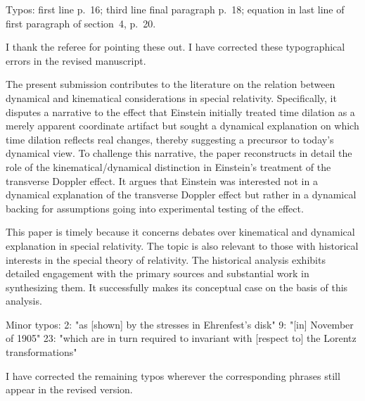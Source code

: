 \documentclass[submitted,11pt]{article}
\begin{document}
\begin{point}
Typos: first line p.~16; third line final paragraph p.~18; equation in last line of first paragraph of section~4, p.~20.
\end{point}

\begin{reply}
I thank the referee for pointing these out. I have corrected these typographical errors in the revised manuscript.
\end{reply}


\reviewersection

\begin{point}
The present submission contributes to the literature on the relation between
dynamical and kinematical considerations in special relativity.  Specifically,
it disputes a narrative to the effect that Einstein initially treated time
dilation as a merely apparent coordinate artifact but sought a dynamical
explanation on which time dilation reflects real changes, thereby suggesting a
precursor to today's dynamical view.  To challenge this narrative, the paper
reconstructs in detail the role of the kinematical/dynamical distinction in
Einstein's treatment of the transverse Doppler effect.  It argues that Einstein
was interested not in a dynamical explanation of the transverse Doppler effect
but rather in a dynamical backing for assumptions going into experimental
testing of the effect.  

This paper is timely because it concerns debates over kinematical and dynamical
explanation in special relativity.  The topic is also relevant to those with
historical interests in the special theory of relativity.  The historical
analysis exhibits detailed engagement with the primary sources and substantial
work in synthesizing them.  It successfully makes its conceptual case on the
basis of this analysis.

Minor typos:
2: "as [shown] by the stresses in Ehrenfest's disk"
9: "[in] November of 1905"
23: "which are in turn required to invariant with [respect to] the Lorentz
transformations"
\end{point}

\begin{reply}
I have corrected the remaining typos wherever the corresponding phrases still appear in the revised version.
\end{reply}
\end{document}
